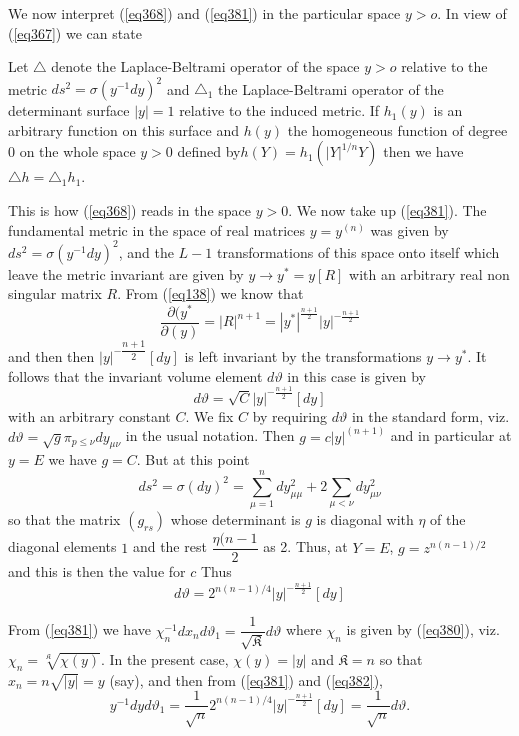 We now interpret (\ref{eq368}) and (\ref{eq381}) in the particular space $y >
o$. In view of (\ref{eq367}) we can state 

\begin{lem}\label{chap17:lem26}%
 Let $\triangle$ denote the Laplace-Beltrami operator of the 
  space $y > o$ relative to the metric $d s^2 = \sigma (y^{-1} d y)^2$
  and $\triangle_1$ the Laplace-Beltrami operator of the determinant
  surface $| y |  = 1$ relative to the induced metric. If $h_1 (y)$ is
  an arbitrary function on this surface and $h (y)$ the homogeneous
  function of degree $0$ on the whole space $y > 0$ defined
  by\pageoriginale $h (Y) = h_1 (| Y|^{1/n} Y)$ then we have
  $\triangle h = \triangle_1 h_1$. 
\end{lem}

This is how (\ref{eq368}) reads in the space $y > 0$. We now take up
(\ref{eq381}). The fundamental metric in the space of real matrices $y =
y^{(n)}$ was given by $d s^2 = \sigma (y^{-1} dy )^2$, and the $L - 1$
transformations of this space onto itself which leave the metric
invariant are given by $y \to y^* = y[R]$ with an arbitrary real non
singular matrix $R$. From (\ref{eq138}) we know that  
$$
\frac{\partial (y^*}{\partial (y)} = | R |^{n + 1} = | y ^* |^{\frac{n
    + 1}{2}} | y | ^{- \frac{n + 1}{2}} 
$$ 
and then then \; $| y | ^{- \dfrac{n + 1}{2}} [ d y]$ \; is left
invariant by the transformations $y \to y^*$. It follows that the
invariant volume element $d \vartheta$ in this case is given by 
$$
d \vartheta = \sqrt {C} | y |^{- \frac{n + 1}{2}} [d y]
$$
with an arbitrary constant $C$. We fix $C$ by requiring $ d \vartheta$
in the standard form, viz. $d \vartheta = \sqrt{g} \pi_{p \le \nu} dy
_{\mu \nu}$ in the usual notation. Then $g = c | y |^{(n + 1)}$ and in
particular at $y = E$ we have $g = C$. But at this point 
$$
d s^2 = \sigma (d y )^2 = \sum^n_{\mu = 1} dy^2 _{\mu \mu} +  2
\sum_{\mu < \nu} dy^2_{\mu \nu} 
$$
so that the matrix $(g_{r s})$ whose determinant is $g$ is diagonal
with $\eta$ of the diagonal elements $1$ and the rest $\dfrac{\eta (n
  - 1}{2}$ as 2. Thus, at $Y = E$, $g = z^{n (n - 1)/2}$ and this is
then the value for $c$ Thus 
\begin{equation*}
d \vartheta = 2^{n(n-1)/4} | y |^{- \frac{n+1}{2}} [ dy ]
\tag{382}\label{eq382}     
 \end{equation*} 
 
 From (\ref{eq381}) we have $\chi^{-1}_{n} d x _n d \vartheta_1 =
 \dfrac{1}{\sqrt{\mathfrak{K}}} d \vartheta$ where $\chi_n$ is given by
 (\ref{eq380}), viz. $\chi_n = \sqrt[\mathfrak{K}]{\chi (y)}$. In the present
 case, $\chi (y) = | y |$ and $\mathfrak{K} = n$ so that $x_n = n 
 \sqrt{| y |} = y$ (say), and then from (\ref{eq381})  and (\ref{eq382}), 
 \begin{equation*}
y^{-1} d y d \vartheta_1 = \frac{1}{\sqrt{n}} 2^{n(n - 1)/4} | y
|^{-\frac{n + 1}{2}} [ d y ] = \frac{1}{\sqrt{n}} d
\vartheta. \tag{383}\label{eq383} 
 \end{equation*}\pageoriginale 
 
